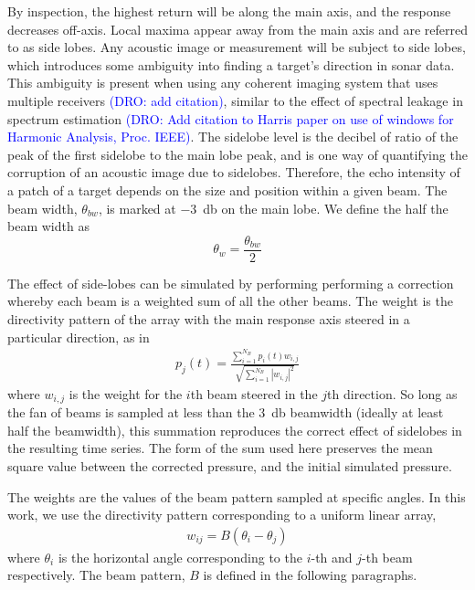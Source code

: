 \documentclass[utf8]{frontiersSCNS} %
\begin{document}
By inspection, the highest return will be along the main axis, and the response decreases off-axis. Local maxima appear away from the main axis and are referred to as side lobes. Any acoustic image or measurement will be subject to side lobes, which introduces some ambiguity into finding a target's direction in sonar data. This ambiguity is present when using any coherent imaging system that uses multiple receivers \textcolor{blue}{(DRO: add citation)}, similar to the effect of spectral leakage in spectrum estimation \textcolor{blue}{(DRO: Add citation to Harris paper on use of windows for Harmonic Analysis, Proc. IEEE)}. The sidelobe level is the decibel of ratio of the peak of the first sidelobe to the main lobe peak, and is one way of quantifying the corruption of an acoustic image due to sidelobes. Therefore, the echo intensity of a patch of a target depends on the size and position within a given beam. The beam width, $\theta_{bw}$, is marked at \SI{-3}{\decibel} on the main lobe. We define the half the beam width as 
\begin{equation}
    \theta_w = \frac{\theta_{bw}}{2}
\end{equation}

The effect of side-lobes can be simulated by performing performing a correction whereby each beam is a weighted sum of all the other beams. The weight is the directivity pattern of the array with the main response axis steered in a particular direction, as in
\begin{align}
    p_{j}(t) = \frac{\sum\limits_{i=1}^{N_B}p_i(t) w_{i,j}}{\sqrt{\sum\limits_{i=1}^{N_B}|w_{i,j}|^2}}
    \label{e:beampatterneffect}
\end{align}
where $w_{i,j}$ is the weight for the $i$th beam steered in the $j$th direction. So long as the fan of beams is sampled at less than the \SI{3}{\decibel} beamwidth (ideally at least half the beamwidth), this summation reproduces the correct effect of sidelobes in the resulting time series. The form of the sum used here preserves the mean square value between the corrected pressure, and the initial simulated pressure.

The weights are the values of the beam pattern sampled at specific angles. In this work, we use the directivity pattern corresponding to a uniform linear array,
\begin{align}
    w_{ij} = B(\theta_{i} - \theta_j)
    \label{e:weights}
\end{align}
where $\theta_i$ is the horizontal angle corresponding to the $i$-th and $j$-th beam respectively. The beam pattern, $B$ is defined in the following paragraphs.
\end{document}
